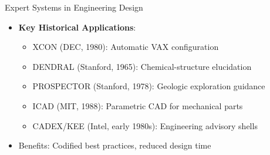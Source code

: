 \documentclass[german,10pt]{beamer}
\begin{document}

\begin{frame}{Expert Systems in Engineering Design}
\begin{itemize}
  \item \textbf{Key Historical Applications}:
  \begin{itemize}
    \item XCON (DEC, 1980): Automatic VAX configuration
    \item DENDRAL (Stanford, 1965): Chemical-structure elucidation
    \item PROSPECTOR (Stanford, 1978): Geologic exploration guidance
    \item ICAD (MIT, 1988): Parametric CAD for mechanical parts
    \item CADEX/KEE (Intel, early 1980s): Engineering advisory shells
  \end{itemize}
  \item Benefits: Codified best practices, reduced design time
\end{itemize}
\end{frame}
\end{document}
